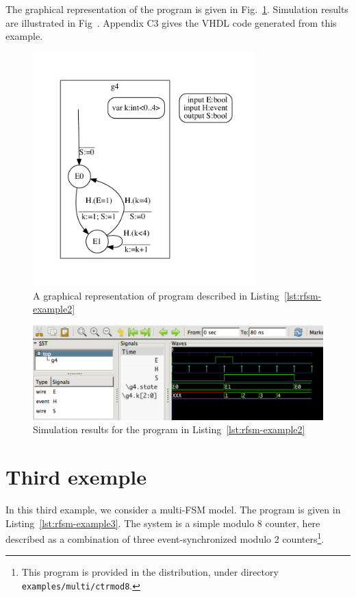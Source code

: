 \medskip
The graphical representation of the program is given in Fig.~\ref{fig:rfsm-example2-top}. Simulation
results are illustrated in Fig~\pageref{fig:rfsm-example2-vcd}. 
Appendix C3 gives the VHDL code generated from this example.

\begin{figure}[h]
   \includegraphics[height=9cm]{figs/gensig-top}
   \centering
  \caption{A graphical representation of program described in Listing~\ref{lst:rfsm-example2}}
  \label{fig:rfsm-example2-top}
\end{figure}

\begin{figure}[h]
   \includegraphics[width=\textwidth]{figs/gensig-chrono}
   \centering
  \caption{Simulation results for the program in Listing~\ref{lst:rfsm-example2}}
  \label{fig:rfsm-example2-vcd}
\end{figure}

\section{Third exemple}
\label{sec:third-exemple}

In this third example, we consider a multi-FSM model. The program is given in
Listing~\ref{lst:rfsm-example3}. The system is a simple modulo 8 counter, here described as a
combination of three event-synchronized modulo 2 counters\footnote{This program is provided in the
  distribution, under directory \texttt{examples/multi/ctrmod8}.}.

